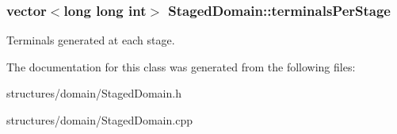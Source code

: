 \subsubsection[{\texorpdfstring{terminals\+Per\+Stage}{terminalsPerStage}}]{\setlength{\rightskip}{0pt plus 5cm}vector$<$long long int$>$ Staged\+Domain\+::terminals\+Per\+Stage\hspace{0.3cm}{\ttfamily [private]}}\hypertarget{class_staged_domain_a8ca1e0466a1ba6563cbe103ac4499364}{}\label{class_staged_domain_a8ca1e0466a1ba6563cbe103ac4499364}
Terminals generated at each stage. 

The documentation for this class was generated from the following files\+:\begin{DoxyCompactItemize}
\item 
structures/domain/Staged\+Domain.\+h\item 
structures/domain/Staged\+Domain.\+cpp\end{DoxyCompactItemize}
